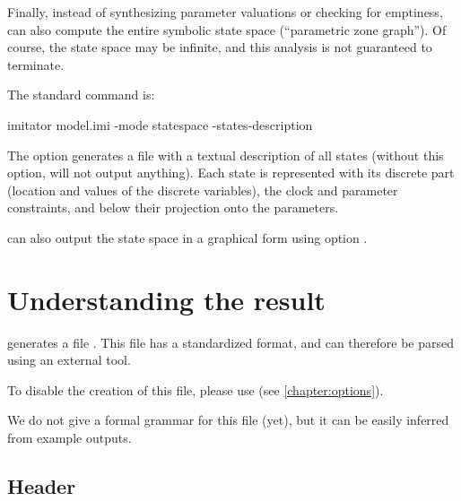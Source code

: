 Finally, instead of synthesizing parameter valuations or checking for emptiness,
\imitator{} can also compute the entire symbolic state space (``parametric zone graph'').
Of course, the state space may be infinite, and this analysis is not guaranteed to terminate.

The standard command is:

\begin{terminal}
imitator model.imi -mode statespace -states-description
\end{terminal}

The option  generates a file with a textual description of all states (without this option, \imitator{} will not output anything).
Each state is represented with its discrete part (location and values of the discrete variables), the clock and parameter constraints, and below their projection onto the parameters.

\imitator{} can also output the state space in a graphical form using option .


\chapter{Understanding the \imitator{} result}\label{chapter:result}

\imitator{} generates a file .
This file has a standardized format, and can therefore be parsed using an external tool.

To disable the creation of this file, please use 
(see \cref{chapter:options}).

We do not give a formal grammar for this file (yet), but it can be easily inferred from example outputs.


\section{Header}

